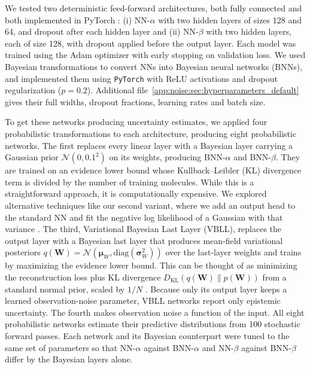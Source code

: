 We tested two deterministic feed-forward architectures, both fully connected and both implemented in PyTorch \citep{Paszke2019}: (i) NN-$\alpha$ with two hidden layers of sizes 128 and 64, and dropout after each hidden layer and (ii) NN-$\beta$ with two hidden layers, each of size 128, with dropout applied before the output layer. Each model was trained using the Adam optimizer with early stopping on validation loss. We used Bayesian transformations to convert NNs into Bayesian neural networks (BNNs), and implemented them using \texttt{PyTorch} \citep{Paszke2019} with ReLU activations and dropout regularization ($p=0.2$). Additional file~\ref{app:noise:sec:hyperparameters_default} gives their full widths, dropout fractions, learning rates and batch size.

To get these networks producing uncertainty estimates, we applied four probabilistic transformations to each architecture, producing eight probabilistic networks. The first replaces every linear layer with a Bayesian layer carrying a Gaussian prior $\mathcal{N}(0, 0.1^2)$ on its weights, producing BNN-$\alpha$ and BNN-$\beta$. They are trained on an evidence lower bound whose  Kullback–Leibler (KL) divergence term is divided by the number of training molecules. While this is a straightforward approach, it is computationally expensive. We explored alternative techniques like our second variant, where we add an output head to the standard NN and fit the negative log likelihood of a Gaussian with that variance \citep{kendall2017}. The third, Variational Bayesian Last Layer (VBLL), replaces the output layer with a Bayesian last layer that produces mean-field variational posteriors $q(\mathbf{W}) = \mathcal{N}(\boldsymbol{\mu}_W, \text{diag}(\boldsymbol{\sigma}_W^2))$ over the last-layer weights and trains by maximizing the evidence lower bound. This can be thought of as minimizing the reconstruction loss plus KL divergence $D_{\text{KL}}(q(\mathbf{W}) \| p(\mathbf{W}))$ from a standard normal prior, scaled by $1/N$ \citep{Harrison2024}. Because only its output layer keeps a learned observation-noise parameter, VBLL networks report only epistemic uncertainty. The fourth makes observation noise a function of the input. All eight probabilistic networks estimate their predictive distributions from 100 stochastic forward passes. Each network and its Bayesian counterpart were tuned to the same set of parameters so that NN-$\alpha$ against BNN-$\alpha$ and NN-$\beta$ against BNN-$\beta$ differ by the Bayesian layers alone. 

